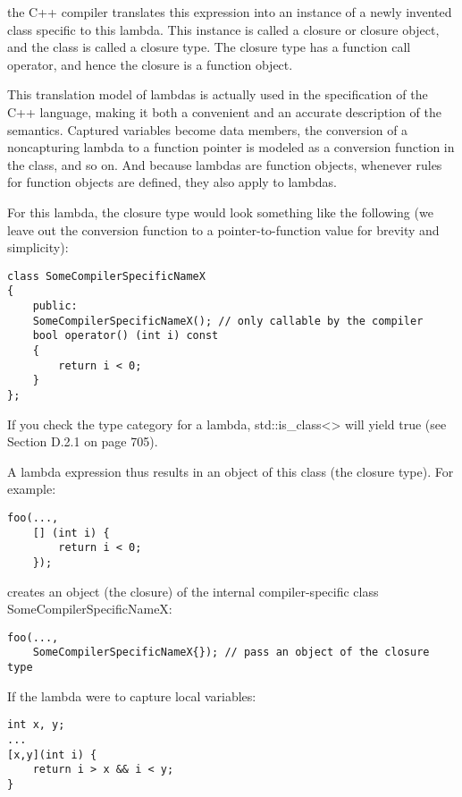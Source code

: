 the C++ compiler translates this expression into an instance of a newly invented class specific to this lambda. This instance is called a closure or closure object, and the class is called a closure type. The closure type has a function call operator, and hence the closure is a function object.

\begin{tcolorbox}[colback=webgreen!5!white,colframe=webgreen!75!black]
\hspace*{0.75cm}This translation model of lambdas is actually used in the specification of the C++ language, making it both a convenient and an accurate description of the semantics. Captured variables become data members, the conversion of a noncapturing lambda to a function pointer is modeled as a conversion function in the class, and so on. And because lambdas are function objects, whenever rules for function objects are defined, they also apply to lambdas.
\end{tcolorbox}

For this lambda, the closure type would look something like the following (we leave out the conversion function to a pointer-to-function value for brevity and simplicity):

\begin{lstlisting}[style=styleCXX]
class SomeCompilerSpecificNameX
{
	public:
	SomeCompilerSpecificNameX(); // only callable by the compiler
	bool operator() (int i) const
	{
		return i < 0;
	}
};
\end{lstlisting}

If you check the type category for a lambda, std::is\_class<> will yield true (see Section D.2.1 on page 705).

A lambda expression thus results in an object of this class (the closure type). For example:

\begin{lstlisting}[style=styleCXX]
foo(...,
	[] (int i) {
		return i < 0;
	});
\end{lstlisting}

creates an object (the closure) of the internal compiler-specific class SomeCompilerSpecificNameX:

\begin{lstlisting}[style=styleCXX]
foo(...,
	SomeCompilerSpecificNameX{}); // pass an object of the closure type
\end{lstlisting}

If the lambda were to capture local variables:

\begin{lstlisting}[style=styleCXX]
int x, y;
...
[x,y](int i) {
	return i > x && i < y;
}
\end{lstlisting}

